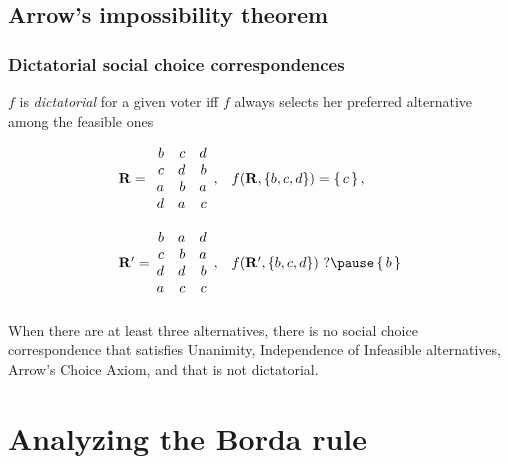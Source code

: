 \documentclass[french, english]{beamer}
\begin{document}
\subsection[Arrow]{Arrow’s impossibility theorem}
\begin{frame}
	\frametitle{Dictatorial social choice correspondences}
	\begin{definition}
		$f$ is \emph{dictatorial} for a given voter iff $f$ always selects her preferred alternative among the feasible ones
	\end{definition}
	\vspace{-1.8pt}
	\begin{example}
		\begin{equation}
			\begin{array}{l@{\hskip 0in}ll}
				\prof =
				&\begin{array}{rrr}
					b	&	c	&	d\\
					c	&	d	&	b\\
					a	&	b	&	a\\
					d	&	a	&	c
				\end{array},
				& f(\prof, \{b, c, d\}) = \set{c},\\[3em]
				\prof' =
				&\begin{array}{rrr}
					b	&	a	&	d\\
					c	&	b	&	a\\
					d	&	d	&	b\\
					a	&	c	&	c
				\end{array},
				& f(\prof', \{b, c, d\})\text{ ?}
				\pause
				\set{b}
			\end{array}
		\end{equation}
	\end{example}
\end{frame}

\begin{frame}
	\frametitle{\subsecname}
	\begin{theorem}[\subsecname]
		When there are at least three alternatives, there is no social choice correspondence that satisfies Unanimity, Independence of Infeasible alternatives, Arrow’s Choice Axiom, and that is not dictatorial.
	\end{theorem}
\end{frame}

\section{Analyzing the Borda rule}
\end{document}
